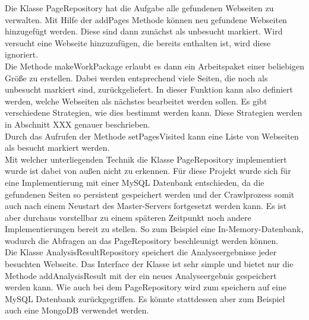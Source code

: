 Die Klasse PageRepository hat die Aufgabe alle gefundenen Webseiten zu verwalten. Mit Hilfe der addPages Methode können neu gefundene Webseiten hinzugefügt werden. Diese sind dann zunächst als unbesucht markiert. Wird versucht eine Webseite hinzuzufügen, die bereits enthalten ist, wird diese ignoriert.\\
Die Methode makeWorkPackage erlaubt es dann ein Arbeitspaket einer beliebigen Größe zu erstellen. Dabei werden entsprechend viele Seiten, die noch als unbesucht markiert sind, zurückgeliefert. In dieser Funktion kann also definiert werden, welche Webseiten als nächstes bearbeitet werden sollen. Es gibt verschiedene Strategien, wie dies bestimmt werden kann. Diese Strategien werden in Abschnitt XXX genauer beschrieben.\\
Durch das Aufrufen der Methode setPagesVisited kann eine Liste von Webseiten als besucht markiert werden. \\
Mit welcher unterliegenden Technik die Klasse PageRepository implementiert wurde ist dabei von außen nicht zu erkennen. Für diese Projekt wurde sich für eine Implementierung mit einer MySQL Datenbank entschieden, da die gefundenen Seiten so persistent gespeichert werden und der Crawlprozess somit auch nach einem Neustart des Master-Servers fortgesetzt werden kann. Es ist aber durchaus vorstellbar zu einem späteren Zeitpunkt noch andere Implementierungen bereit zu stellen. So zum Beispiel eine In-Memory-Datenbank, wodurch die Abfragen an das PageRepository beschleunigt werden können.\\
Die Klasse AnalysisResultRepository speichert die Analyseergebnisse jeder besuchten Webseite. Das Interface der Klasse ist sehr simple und bietet nur die Methode addAnalysisResult mit der ein neues Analyseergebnis gespeichert werden kann. Wie auch bei dem PageRepository wird zum speichern auf eine MySQL Datenbank zurückgegriffen. Es könnte stattdessen aber zum Beispiel auch eine MongoDB verwendet werden.

